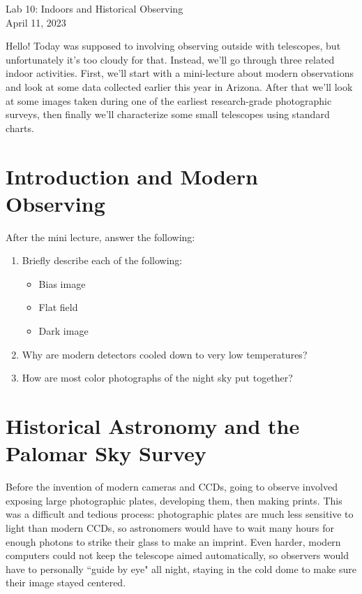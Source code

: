 \documentclass[11pt]{article}
\begin{document}
\begin{center}
\huge{Lab 10: Indoors and Historical Observing}\\ \medskip \Large{April 11, 2023}
\end{center}

Hello! Today was supposed to involving observing outside with telescopes, but unfortunately it's too cloudy for that. Instead, we'll go through three related indoor activities. First, we'll start with a mini-lecture about modern observations and look at some data collected earlier this year in Arizona. After that we'll look at some images taken during one of the earliest research-grade photographic surveys, then finally we'll characterize some small telescopes using standard charts.

\section{Introduction and Modern Observing}

After the mini lecture, answer the following:


\begin{enumerate}
    \item Briefly describe each of the following:
    \begin{itemize}
        \item Bias image
        \item Flat field
        \item Dark image
    \end{itemize}
    \item Why are modern detectors cooled down to very low temperatures?
    \item How are most color photographs of the night sky put together?
\end{enumerate}

\section{Historical Astronomy and the Palomar Sky Survey}

Before the invention of modern cameras and CCDs, going to observe involved exposing large photographic plates, developing them, then making prints. This was a difficult and tedious process: photographic plates are much less sensitive to light than modern CCDs, so astronomers would have to wait many hours for enough photons to strike their glass to make an imprint. Even harder, modern computers could not keep the telescope aimed automatically, so observers would have to personally ``guide by eye" all night, staying in the cold dome to make sure their image stayed centered.
\end{document}
